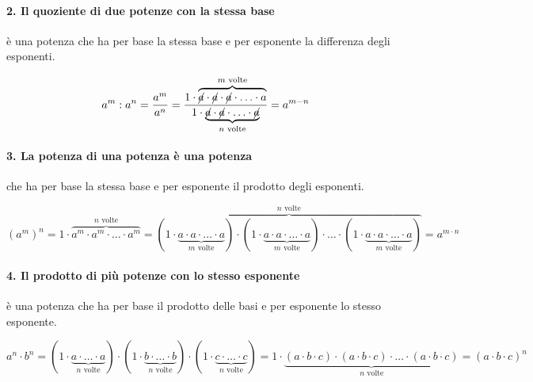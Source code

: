 \paragraph{2. Il quoziente di due potenze con la stessa base} 
è una potenza che ha per base la stessa base e per esponente la differenza 
degli esponenti.

\[
 a^m: a^n = \frac{a^m}{a^n}=
 \frac{1 \cdot \overbrace{\cancel{a} \cdot \cancel{a} \cdot \cancel{a} \cdot 
                  \ldots \cdot a}^{m \text{ volte}}}
 {1 \cdot \underbrace{\cancel{a} \cdot \cancel{a} \cdot
                  \ldots \cdot \cancel{a}}_{n \text{ volte}}}=
 a^{m-n}
\]

\vspace{-1.5em}
\paragraph{3. La potenza di una potenza è una potenza} 
che ha per base la stessa base e per esponente il prodotto degli esponenti.

\[(a^m)^n =
1 \cdot \overbrace{a^m\cdot a^m\cdot\ldots\cdot a^m}^{n\text{ volte}}%
 =\overbrace{(1 \cdot \underbrace{a\cdot a\cdot\ldots\cdot a}_{m\text{ 
volte}})\cdot%
   (1 \cdot \underbrace{a\cdot a\cdot\ldots\cdot a}_{m\text{ 
volte}})\cdot\ldots\cdot%
   (1 \cdot \underbrace{a\cdot a\cdot\ldots\cdot a}_{m\text{ 
volte}})}^{n\text{ volte}}%
   =a^{m\cdot n}\]
   
\vspace{-1.5em}
\paragraph{4. Il prodotto di più potenze con lo stesso esponente} 
è una potenza che ha per base il prodotto delle basi e per esponente lo stesso
esponente.

\[a^n \cdot b^n=
  (1 \cdot \underbrace{a \cdot \ldots \cdot a}_{n\text{ volte}}) \cdot
  (1 \cdot \underbrace{b \cdot \ldots \cdot b}_{n\text{ volte}}) \cdot
  (1 \cdot \underbrace{c \cdot \ldots \cdot c}_{n\text{ volte}})=
  1 \cdot \underbrace{(a \cdot b \cdot c) \cdot (a \cdot b \cdot c) \cdot
              \ldots \cdot (a \cdot b \cdot c)}_{n\text{ volte}}=
   (a \cdot b \cdot c)^n\]
   
